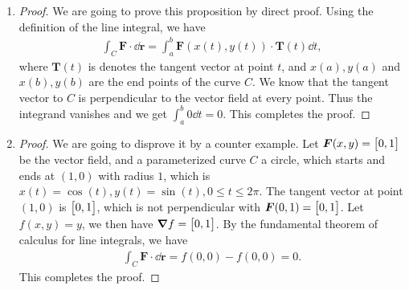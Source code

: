 \documentclass[8pt,twocolumn]{article}
\begin{document}
\begin{Answer}[number=35]
  \begin{enumerate}
    \item \begin{proof}
      We are going to prove this proposition by direct proof. Using the
      definition of the line integral, we have
      \begin{align*}
        \int_C \bm{F}\cdot \dd{\bm{r}} = \int_a^b \bm{F}(x(t), y(t)) \cdot
        \bm{T}(t) \dd{t},
      \end{align*}
      where $\bm{T}(t)$ is denotes the tangent vector at point $t$, and $x(a),
      y(a)$ and $x(b), y(b)$ are the end points of the curve $C$.
      We know that the tangent vector to $C$ is perpendicular to the vector
      field at every point. Thus the integrand vanishes and we get $\int_a^b 0
      \dd{t} = 0$. This completes the proof.
    \end{proof}
    \item \begin{proof}
        We are going to disprove it by a counter example. Let $\bm{F}(x,y) =
        \mqty[0, 1]$ be the vector field, and a parameterized curve $C$ a circle,
        which starts and ends at $(1,0)$ with radius $1$, which is
        $x(t)=\cos(t), y(t)=\sin(t), 0\le t\le 2\pi$. The tangent vector at
        point $(1,0)$ is $\mqty[0, 1]$, which is not perpendicular with
        $\bm{F}(0, 1) = \mqty[0, 1]$. Let $f(x,y)=y$, we then have $\grad f =
        \mqty[0, 1]$. By the fundamental theorem of calculus for line
        integrals, we have
        \begin{align*}
          \int_C \bm{F}\cdot \dd{\bm{r}}= f(0,0) - f(0,0) = 0.
        \end{align*}
        This completes the proof.
    \end{proof}
  \end{enumerate}
\end{Answer}
\end{document}
